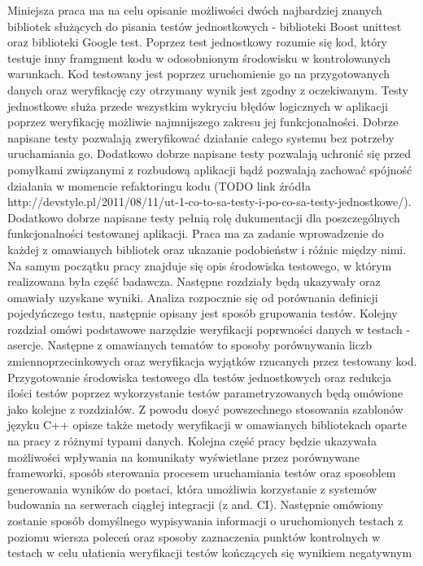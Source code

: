 \documentclass[12pt,a4paper,notitlepage]{report}
\begin{document}
Miniejsza praca ma na celu opisanie możliwości dwóch najbardziej znanych bibliotek służących do pisania testów jednostkowych - biblioteki Boost unittest oraz biblioteki Google test.
Poprzez test jednostkowy rozumie się kod, który testuje inny framgment kodu w odosobnionym środowisku w kontrolowanych warunkach. Kod testowany jest poprzez uruchomienie go na przygotowanych danych oraz weryfikację czy otrzymany wynik jest zgodny z oczekiwanym.
Testy jednostkowe służa przede wszystkim wykryciu błędów logicznych w aplikacji poprzez weryfikację możliwie najmnijszego zakresu jej funkcjonalności. Dobrze napisane testy pozwalają zweryfikować działanie całego systemu bez potrzeby uruchamiania go. Dodatkowo dobrze napisane testy pozwalają uchronić się przed pomyłkami związanymi z rozbudową aplikacji bądź pozwalają zachować spójność działania w momencie refaktoringu kodu (TODO link źródła http://devstyle.pl/2011/08/11/ut-1-co-to-sa-testy-i-po-co-sa-testy-jednostkowe/).
Dodatkowo dobrze napisane testy pełnią rolę dukumentacji dla poszczególnych funkcjonalności testowanej aplikacji.
Praca ma za zadanie wprowadzenie do każdej z omawianych bibliotek oraz ukazanie podobieństw i róźnic między nimi.
Na samym początku pracy znajduje się opis środowiska testowego, w którym realizowana była część badawcza. Następne rozdziały będą ukazywały oraz omawiały uzyskane wyniki.
Analiza rozpocznie się od porównania definicji pojedyńczego testu, następnie opisany jest sposób grupowania testów. Kolejny rozdział omówi podstawowe narzędzie weryfikacji poprwności danych w testach - asercje.
Następne z omawianych tematów to sposoby porównywania liczb zmiennoprzecinkowych oraz weryfikacja wyjątków rzucanych przez testowany kod. Przygotowanie środowiska testowego dla testów jednostkowych oraz redukcja ilości testów poprzez wykorzystanie testów parametryzowanych będą omówione jako kolejne z rozdziałów.
Z powodu dosyć powszechnego stosowania szablonów języku C++ opisze także metody weryfikacji w omawianych bibliotekach oparte na pracy z różnymi typami danych.
Kolejna część pracy będzie ukazywała możliwości wpływania na komunikaty wyświetlane przez porównywane frameworki, sposób sterowania procesem uruchamiania testów oraz sposoblem generowania wyników do postaci, która umożliwia korzystanie z systemów budowania na serwerach ciągłej integracji (z and. CI).
Następnie omówiony zostanie sposób domyślnego wypisywania informacji o uruchomionych testach z poziomu wiersza poleceń oraz sposoby zaznaczenia punktów kontrolnych w testach w celu ułatienia weryfikacji testów kończących się wynikiem negatywnym
\end{document}
